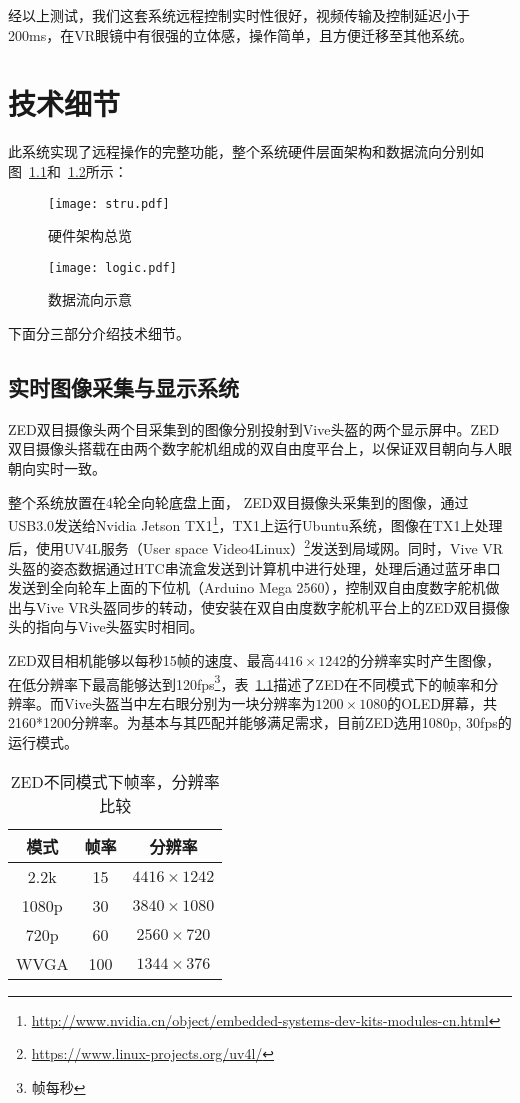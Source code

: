 经以上测试，我们这套系统远程控制实时性很好，视频传输及控制延迟小于200ms，在VR眼镜中有很强的立体感，操作简单，且方便迁移至其他系统。



\chapter{技术细节}

此系统实现了远程操作的完整功能，整个系统硬件层面架构和数据流向分别如图~\ref{stru}和~\ref{logic}所示：

\begin{figure}[htbp]
\small
\centering
\texttt{[image: stru.pdf]}
\caption{硬件架构总览} 
\label{stru}
\end{figure}

\begin{figure}[htbp]
\small
\centering
\texttt{[image: logic.pdf]}
\caption{数据流向示意} 
\label{logic}
\end{figure}

下面分三部分介绍技术细节。

\section{实时图像采集与显示系统}
ZED双目摄像头两个目采集到的图像分别投射到Vive头盔的两个显示屏中。ZED双目摄像头搭载在由两个数字舵机组成的双自由度平台上，以保证双目朝向与人眼朝向实时一致。

整个系统放置在4轮全向轮底盘上面， ZED双目摄像头采集到的图像，通过USB3.0发送给Nvidia Jetson TX1\footnote{\url{http://www.nvidia.cn/object/embedded-systems-dev-kits-modules-cn.html}}，TX1上运行Ubuntu系统，图像在TX1上处理后，使用UV4L服务（User space Video4Linux）\footnote{\url{https://www.linux-projects.org/uv4l/}}发送到局域网。同时，Vive VR头盔的姿态数据通过HTC串流盒发送到计算机中进行处理，处理后通过蓝牙串口发送到全向轮车上面的下位机（Arduino Mega 2560），控制双自由度数字舵机做出与Vive VR头盔同步的转动，使安装在双自由度数字舵机平台上的ZED双目摄像头的指向与Vive头盔实时相同。

ZED双目相机能够以每秒15帧的速度、最高$4416\times1242$的分辨率实时产生图像，在低分辨率下最高能够达到120fps\footnote{帧每秒}，表~\ref{zhenlv}描述了ZED在不同模式下的帧率和分辨率。而Vive头盔当中左右眼分别为一块分辨率为$1200\times1080$的OLED屏幕，共2160*1200分辨率。为基本与其匹配并能够满足需求，目前ZED选用1080p, 30fps的运行模式。

\begin{table}[htbp]
	\centering
	\caption{ZED不同模式下帧率，分辨率比较}
	\begin{tabular}{ccc}
		\toprule
		模式    & 帧率    & 分辨率 \\
		\midrule
		2.2k  & 15    & $4416\times1242$ \\
		\midrule
		1080p & 30    & $3840\times1080$ \\
		\midrule
		720p  & 60    & $2560\times720$ \\
		\midrule
		WVGA  & 100   & $1344\times376$ \\
		\bottomrule
	\end{tabular}%
\label{zhenlv}
\end{table}%


